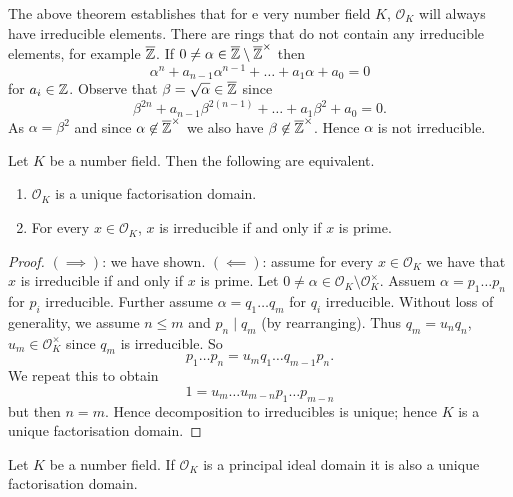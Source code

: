 
The above theorem establishes that for e very number field $K$, $\mathcal O_K$
will always have irreducible elements.
There are rings that do not contain any irreducible elements, for example 
$\overline {\mathbb{Z}}$.
If $0 \neq \alpha \in \overline{\mathbb{Z}} \setminus \overline {\mathbb{Z}}^\times$ then
\[
	\alpha^n + a_{n-1} \alpha^{n-1} + \ldots + a_1 \alpha + a_0 = 0
\]
for $a_i \in \mathbb{Z}$.
Observe that $\beta = \sqrt{\alpha} \in \overline {\mathbb{Z}}$ since
\[
	\beta^{2n} + a_{n-1} \beta^{2(n-1)} + \ldots + a_1 \beta^2 + a_0 = 0.
\]
As $\alpha = \beta^2$ and since $\alpha \not\in \overline{\mathbb{Z}}^\times$ we also
have $\beta \not\in \overline{\mathbb{Z}}^\times$.
Hence $\alpha$ is not irreducible.

\begin{theorem}[]
	Let $K$ be a number field.
	Then the following are equivalent.
	\begin{enumerate}
		\item $\mathcal O_K$ is a unique factorisation domain.
		\item For every $x \in \mathcal O_K$, $x$ is irreducible if and only if
			$x$ is prime.
	\end{enumerate}
\end{theorem}

\begin{proof}
	$(\implies)$: we have shown.
	$(\impliedby)$: assume for every $x \in \mathcal O_K$ we have that
	$x$ is irreducible if and only if $x$ is prime.
	Let $0 \neq \alpha \in \mathcal O_K \setminus \mathcal O_K^\times$.
	Assuem $\alpha = p_1 \ldots p_n$ for $p_i$ irreducible.
	Further assume $\alpha = q_1 \ldots q_m$ for $q_i$ irreducible.
	Without loss of generality, we assume $n \leq m$ and $p_n \mid q_m$
	(by rearranging).
	Thus $q_m = u_n q_n$, $u_m \in \mathcal O_K^\times$ since $q_m$ is
	irreducible.
	So
	\[
		p_1 \ldots p_n = u_m q_1 \ldots q_{m-1} p_n.
	\]
	We repeat this to obtain
	\[
		1 = u_m \ldots u_{m-n} p_1 \ldots p_{m-n}
	\]
	but then $n = m$. 
	Hence decomposition to irreducibles is unique;
	hence $K$ is a unique factorisation domain.
\end{proof}

\begin{corollary}
	Let $K$ be a number field.
	If $\mathcal O_K$ is a principal ideal domain it is also a
	unique factorisation domain.
\end{corollary}


